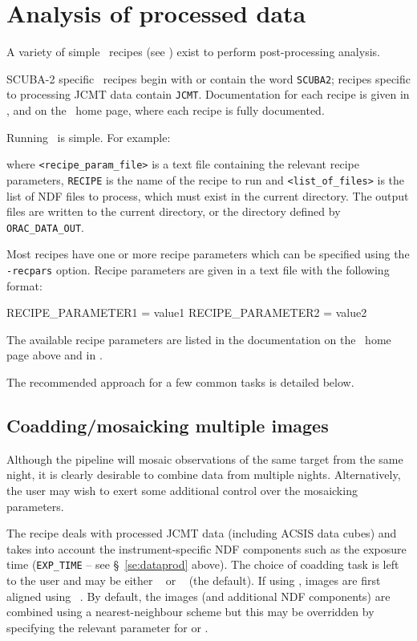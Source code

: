 \section{Analysis of processed data\label{picard}}

A variety of simple \picard\ recipes (see \picardsun) exist to perform
post-processing analysis.

SCUBA-2 specific \picard\ recipes begin with or contain the word
\verb+SCUBA2+; recipes specific to processing JCMT data contain
\verb+JCMT+. Documentation for each recipe is given in \picardsun, and
on the \picard\ home page,
where each recipe is fully documented.

Running \picard\ is simple. For example:
\begin{terminalv}
\end{terminalv}
where \verb+<recipe_param_file>+ is a text file containing the
relevant recipe parameters, \verb+RECIPE+ is the name of the
recipe to run and \verb+<list_of_files>+ is the list of NDF files to
process, which must exist in the current directory. The output files
are written to the current directory, or the directory defined by
\verb+ORAC_DATA_OUT+.

Most recipes have one or more recipe parameters which can be specified
using the \texttt{-recpars} option. Recipe parameters are given in a
text file with the following format:
\begin{terminalv}
RECIPE_PARAMETER1 = value1
RECIPE_PARAMETER2 = value2
\end{terminalv}
The available recipe parameters are listed in the documentation on the
\picard\ home page above and in \picardsun.

The recommended approach for a few common tasks is detailed below.

\subsection{Coadding/mosaicking multiple images}

Although the pipeline will mosaic observations of the same target from
the same night, it is clearly desirable to combine data from multiple
nights. Alternatively, the user may wish to exert some additional
control over the mosaicking parameters.

The  recipe deals with processed JCMT data
(including ACSIS data cubes) and takes into account the
instrument-specific NDF components such as the exposure time
(\verb+EXP_TIME+ -- see \S\ \ref{se:dataprod} above). The choice of
coadding task is left to the user and may be either
\CCDPACK\  or \KAPPA\  (the default). If
using , images are first aligned using
\KAPPA\ . By default, the images (and additional NDF
components) are combined using a nearest-neighbour scheme but this may
be overridden by specifying the relevant parameter for
 or .

